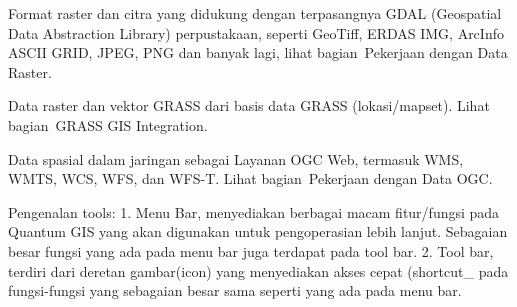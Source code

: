 Format raster dan citra yang didukung dengan terpasangnya GDAL (Geospatial Data Abstraction Library) perpustakaan, seperti GeoTiff, ERDAS IMG, ArcInfo ASCII GRID, JPEG, PNG dan banyak lagi, lihat bagian Pekerjaan dengan Data Raster.

Data raster dan vektor GRASS dari basis data GRASS (lokasi/mapset). Lihat bagian GRASS GIS Integration.

Data spasial dalam jaringan sebagai Layanan OGC Web, termasuk WMS, WMTS, WCS, WFS, dan WFS-T. Lihat bagian Pekerjaan dengan Data OGC.

Pengenalan tools:
1.	Menu Bar, menyediakan berbagai macam fitur/fungsi pada Quantum GIS yang akan digunakan untuk pengoperasian lebih lanjut. Sebagaian besar fungsi yang ada pada menu bar juga terdapat pada tool bar.
2.	Tool bar, terdiri dari deretan gambar(icon) yang menyediakan akses cepat (shortcut_ pada fungsi-fungsi yang sebagaian besar sama seperti yang ada pada menu bar.
